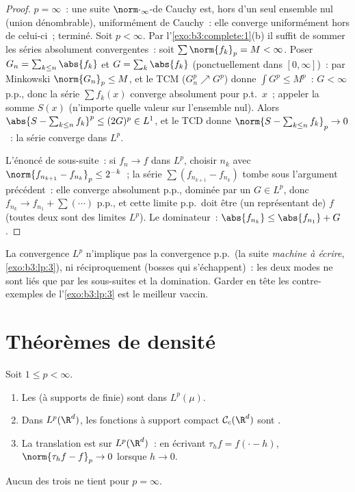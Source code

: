 \begin{proof}
$p = \infty$~: une suite $\norm\cdot_\infty$-de Cauchy est,
hors d'un seul ensemble nul (union dénombrable),
uniformément de Cauchy~: elle converge uniformément hors de
celui-ci~; terminé. Soit $p < \infty$. Par
l'\cref{exo:b3:complete:1}(b) il suffit de sommer les séries
absolument convergentes~: soit $\sum\norm{f_k}_p = M <
\infty$. Poser $G_n = \sum_{k \leq n}\abs{f_k}$ et $G =
\sum_k\abs{f_k}$ (ponctuellement dans $[0,\infty]$)~: par
Minkowski $\norm{G_n}_p \leq M$, et le TCM ($G_n^p \nearrow
G^p$) donne $\int G^p \leq M^p$~: $G < \infty$ p.p., donc la
série $\sum f_k(x)$ converge absolument pour p.t.\ $x$~;
appeler la somme $S(x)$ (n'importe quelle valeur sur
l'ensemble nul). Alors $\abs{S - \sum_{k\leq n}f_k}^p \leq
(2G)^p \in L^1$, et le TCD donne $\norm{S - \sum_{k\leq
n}f_k}_p \to 0$~: la série converge dans $L^p$.

L'énoncé de sous-suite~: si $f_n \to f$ dans $L^p$, choisir
$n_k$ avec $\norm{f_{n_{k+1}} - f_{n_k}}_p \leq 2^{-k}$~; la
série $\sum(f_{n_{k+1}} - f_{n_k})$ tombe sous l'argument
précédent~: elle converge absolument p.p., dominée par un $G
\in L^p$, donc $f_{n_k} \to f_{n_1} + \sum(\cdots) $ p.p., et
cette limite p.p.\ doit être (un représentant de) $f$ (toutes
deux sont des limites $L^p$). Le dominateur~:
$\abs{f_{n_k}} \leq \abs{f_{n_1}} + G$.
\end{proof}

\begin{remark}\label{rem:b3:lp:modes}
La convergence $L^p$ n'implique pas la convergence p.p.\ (la
suite \emph{machine à écrire}, \cref{exo:b3:lp:3}), ni
réciproquement (bosses qui s'échappent)~: les deux modes ne
sont liés que par les sous-suites et la domination. Garder en
tête les contre-exemples de l'\cref{exo:b3:lp:3} est le
meilleur vaccin.
\end{remark}

\section{Théorèmes de densité}

\begin{theorem}\label{thm:b3:lp:density}
Soit $1 \leq p < \infty$.
\begin{enumerate}
  \item Les  (à supports de  finie)
        sont  dans $L^p(\mu)$.
  \item Dans $L^p(\R^d)$, les fonctions  à support
        compact $\mathcal C_c(\R^d)$ sont .
  \item La translation est  sur $L^p(\R^d)$~: en
        écrivant $\tau_hf = f(\cdot - h)$, $\norm{\tau_hf -
        f}_p \to 0$ lorsque $h \to 0$.
\end{enumerate}
Aucun des trois ne tient pour $p = \infty$.
\end{theorem}

